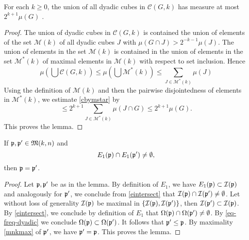 \begin{lemma}
\label{dense-cover}
\leanok
{}

For each $k\ge 0$, the union of all dyadic cubes
in $\mathcal{C}(G,k)$ has measure at most $2^{k+1} \mu(G)$ .
\end{lemma}
\begin{proof}
\leanok
The union of dyadic cubes in $\mathcal{C}(G,k)$
is contained the union of elements of the set $\mathcal{M}(k)$
of all dyadic cubes $J$ with
${\mu(G \cap J)} > 2^{-k-1}{\mu(J)}$.
The union of elements in the set $\mathcal{M}(k)$ is contained in the union of elements in
the set $\mathcal{M}^*(k)$ of maximal elements in
$\mathcal{M}(k)$ with respect to set inclusion. Hence
\begin{equation}\label{cbymstar}
\mu (\bigcup \mathcal{C}(G,k))\le \mu (\bigcup \mathcal{M}^*(k))\le
\sum_{J\in \mathcal{M}^*(k)}\mu(J)
\end{equation}
Using the definition of $\mathcal{M}(k)$ and then
the pairwise disjointedness of elements in
$\mathcal{M}^*(k)$,
we estimate \eqref{cbymstar} by
\begin{equation}
\le
2^{k+1}\sum_{J\in \mathcal{M}^*(k)}\mu(J\cap G)
\le 2^{k+1}\mu(G).
\end{equation}
This proves the lemma.
\end{proof}

\begin{lemma}
    \label{pairwise-disjoint}
    \leanok
    If ${\mathfrak p}, {\mathfrak p}' \in {\mathfrak{M}}(k,n)$ and
    \begin{equation}\label{eintersect}
        {E_1}({\mathfrak p})\cap {E_1}({\mathfrak p}')\neq \emptyset,
    \end{equation}
    then ${\mathfrak p}={\mathfrak p}'$.
\end{lemma}
\begin{proof}
\leanok
Let ${\mathfrak p},{\mathfrak p}'$ be as in the lemma. By definition of $E_1$,
we have
$E_1({\mathfrak p})\subset {\mathcal{I}}({\mathfrak p})$ and analogously for ${\mathfrak p}'$, we conclude from \eqref{eintersect} that ${\mathcal{I}}({\mathfrak p})\cap {\mathcal{I}}({\mathfrak p}')\neq \emptyset$. Let without loss of generality ${\mathcal{I}}({\mathfrak p})$ be maximal in
$\{{\mathcal{I}}({\mathfrak p}),{\mathcal{I}}({\mathfrak p}')\}$, then ${\mathcal{I}}({\mathfrak p}')\subset {\mathcal{I}}({\mathfrak p})$.
By \eqref{eintersect}, we conclude by definition of $E_1$ that ${\Omega}({\mathfrak p})\cap {\Omega}({\mathfrak p}')\neq \emptyset$. By
\eqref{eq-freq-dyadic} we conclude ${\Omega}({\mathfrak p})\subset {\Omega}({\mathfrak p}')$. It follows that ${\mathfrak p}'\le {\mathfrak p}$. By maximality
\eqref{mnkmax}
of ${\mathfrak p}'$, we have ${\mathfrak p}'={\mathfrak p}$. This proves the lemma.
\end{proof}


